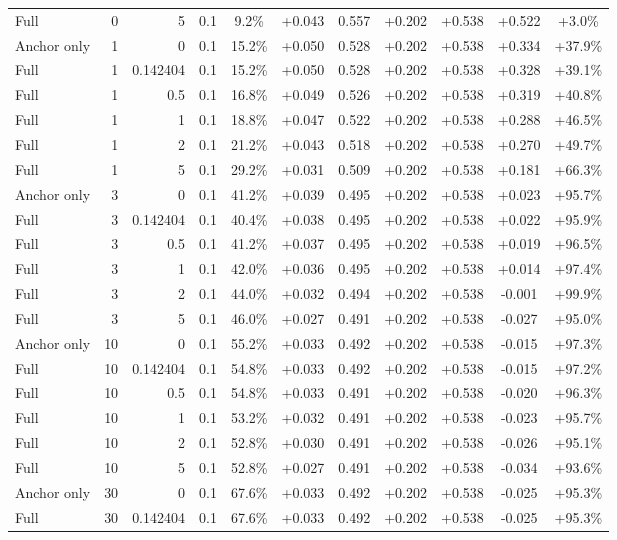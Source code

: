 \begin{table}[htbp]
\begin{tabular}{lrrrccccccc}
Full & 0 & 5 & 0.1 & 9.2\% & +0.043 & 0.557 & +0.202 & +0.538 & +0.522 & +3.0\% \\
Anchor only & 1 & 0 & 0.1 & 15.2\% & +0.050 & 0.528 & +0.202 & +0.538 & +0.334 & +37.9\% \\
Full & 1 & 0.142404 & 0.1 & 15.2\% & +0.050 & 0.528 & +0.202 & +0.538 & +0.328 & +39.1\% \\
Full & 1 & 0.5 & 0.1 & 16.8\% & +0.049 & 0.526 & +0.202 & +0.538 & +0.319 & +40.8\% \\
Full & 1 & 1 & 0.1 & 18.8\% & +0.047 & 0.522 & +0.202 & +0.538 & +0.288 & +46.5\% \\
Full & 1 & 2 & 0.1 & 21.2\% & +0.043 & 0.518 & +0.202 & +0.538 & +0.270 & +49.7\% \\
Full & 1 & 5 & 0.1 & 29.2\% & +0.031 & 0.509 & +0.202 & +0.538 & +0.181 & +66.3\% \\
Anchor only & 3 & 0 & 0.1 & 41.2\% & +0.039 & 0.495 & +0.202 & +0.538 & +0.023 & +95.7\% \\
Full & 3 & 0.142404 & 0.1 & 40.4\% & +0.038 & 0.495 & +0.202 & +0.538 & +0.022 & +95.9\% \\
Full & 3 & 0.5 & 0.1 & 41.2\% & +0.037 & 0.495 & +0.202 & +0.538 & +0.019 & +96.5\% \\
Full & 3 & 1 & 0.1 & 42.0\% & +0.036 & 0.495 & +0.202 & +0.538 & +0.014 & +97.4\% \\
Full & 3 & 2 & 0.1 & 44.0\% & +0.032 & 0.494 & +0.202 & +0.538 & -0.001 & +99.9\% \\
Full & 3 & 5 & 0.1 & 46.0\% & +0.027 & 0.491 & +0.202 & +0.538 & -0.027 & +95.0\% \\
Anchor only & 10 & 0 & 0.1 & 55.2\% & +0.033 & 0.492 & +0.202 & +0.538 & -0.015 & +97.3\% \\
Full & 10 & 0.142404 & 0.1 & 54.8\% & +0.033 & 0.492 & +0.202 & +0.538 & -0.015 & +97.2\% \\
Full & 10 & 0.5 & 0.1 & 54.8\% & +0.033 & 0.491 & +0.202 & +0.538 & -0.020 & +96.3\% \\
Full & 10 & 1 & 0.1 & 53.2\% & +0.032 & 0.491 & +0.202 & +0.538 & -0.023 & +95.7\% \\
Full & 10 & 2 & 0.1 & 52.8\% & +0.030 & 0.491 & +0.202 & +0.538 & -0.026 & +95.1\% \\
Full & 10 & 5 & 0.1 & 52.8\% & +0.027 & 0.491 & +0.202 & +0.538 & -0.034 & +93.6\% \\
Anchor only & 30 & 0 & 0.1 & 67.6\% & +0.033 & 0.492 & +0.202 & +0.538 & -0.025 & +95.3\% \\
Full & 30 & 0.142404 & 0.1 & 67.6\% & +0.033 & 0.492 & +0.202 & +0.538 & -0.025 & +95.3\% \\

\end{tabular}
\end{table}
